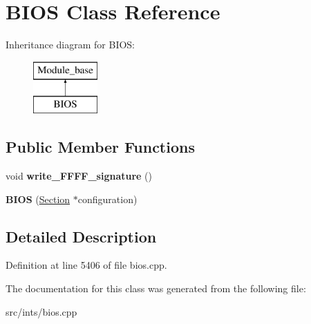\hypertarget{classBIOS}{\section{B\-I\-O\-S Class Reference}
\label{classBIOS}
}
Inheritance diagram for B\-I\-O\-S\-:\begin{figure}[H]
\begin{center}
\leavevmode
\includegraphics[height=2.000000cm]{classBIOS}
\end{center}
\end{figure}
\subsection*{Public Member Functions}
\begin{DoxyCompactItemize}
\item 
\hypertarget{classBIOS_ae2cf67c9872366656b32695ce56b3c0a}{void {\bfseries write\-\_\-\-F\-F\-F\-F\-\_\-signature} ()}\label{classBIOS_ae2cf67c9872366656b32695ce56b3c0a}

\item 
\hypertarget{classBIOS_a04ed247011d175b84c556487820fd64c}{{\bfseries B\-I\-O\-S} (\hyperlink{classSection}{Section} $\ast$configuration)}\label{classBIOS_a04ed247011d175b84c556487820fd64c}

\end{DoxyCompactItemize}


\subsection{Detailed Description}


Definition at line 5406 of file bios.\-cpp.



The documentation for this class was generated from the following file\-:\begin{DoxyCompactItemize}
\item 
src/ints/bios.\-cpp\end{DoxyCompactItemize}
